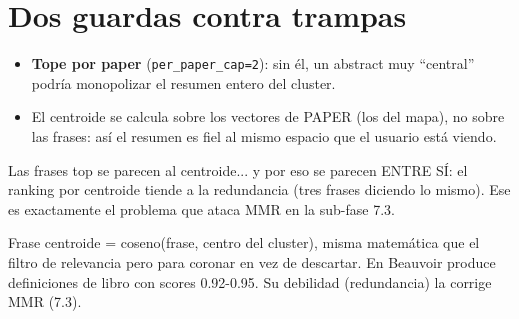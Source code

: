 \documentclass[11pt,a4paper]{article}
\begin{document}
\section{Dos guardas contra trampas}

\begin{itemize}
  \item \textbf{Tope por paper} (\texttt{per\_paper\_cap=2}): sin él, un abstract muy
        ``central'' podría monopolizar el resumen entero del cluster.
  \item El centroide se calcula sobre los vectores de PAPER (los del mapa), no sobre las
        frases: así el resumen es fiel al mismo espacio que el usuario está viendo.
\end{itemize}

\begin{ojo}
Las frases top se parecen al centroide... y por eso se parecen ENTRE SÍ: el ranking por
centroide tiende a la redundancia (tres frases diciendo lo mismo). Ese es exactamente el
problema que ataca MMR en la sub-fase 7.3.
\end{ojo}

\begin{resumen}
Frase centroide = coseno(frase, centro del cluster), misma matemática que el filtro de
relevancia pero para coronar en vez de descartar. En Beauvoir produce definiciones de
libro con scores 0.92-0.95. Su debilidad (redundancia) la corrige MMR (7.3).
\end{resumen}
\end{document}
